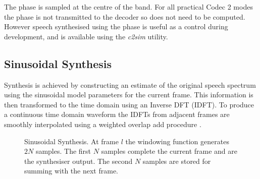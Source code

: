 \documentclass{article}
\begin{document}
The phase is sampled at the centre of the band.  For all practical Codec 2 modes the phase is not transmitted to the decoder so does not need to be computed.  However speech synthesised using the phase is useful as a control during development, and is available using the \emph{c2sim} utility.

\subsection{Sinusoidal Synthesis}

Synthesis is achieved by constructing an estimate of the original speech spectrum using the sinusoidal model parameters for the current frame. This information is then transformed to the time domain using an Inverse DFT (IDFT). To produce a continuous time domain waveform the IDFTs from adjacent frames are smoothly interpolated using a weighted overlap add procedure \cite{mcaulay1986speech}.

\begin{figure}[h]
\caption{Sinusoidal Synthesis.  At frame $l$ the windowing function generates $2N$ samples.  The first $N$ samples complete the current frame and are the synthesiser output. The second $N$ samples are stored for summing with the next frame.}
\label{fig:synthesis}
\begin{center}
\end{center}
\end{figure}
\end{document}
